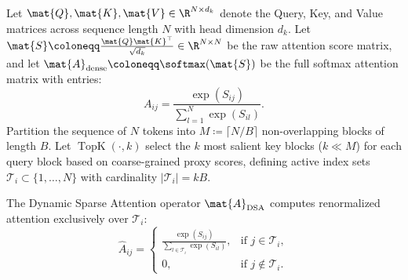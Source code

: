 \begin{theorem}
\label{thm:dsa_gradient_alignment}
Let $\mat{Q}, \mat{K}, \mat{V} \in \R^{N \times d_k}$ denote the Query, Key, and Value matrices across sequence length $N$ with head dimension $d_k$. Let $\mat{S} \coloneqq \frac{\mat{Q} \mat{K}^\top}{\sqrt{d_k}} \in \R^{N \times N}$ be the raw attention score matrix, and let $\mat{A}_{\text{dense}} \coloneqq \softmax(\mat{S})$ be the full softmax attention matrix with entries:
\begin{equation}
A_{ij} = \frac{\exp(S_{ij})}{\sum_{l=1}^N \exp(S_{il})}.
\label{eq:dense_softmax_entry}
\end{equation}
Partition the sequence of $N$ tokens into $M \coloneqq \lceil N / B \rceil$ non-overlapping blocks of length $B$. Let $\operatorname{TopK}(\cdot, k)$ select the $k$ most salient key blocks ($k \ll M$) for each query block based on coarse-grained proxy scores, defining active index sets $\mathcal{T}_i \subset \{1, \dots, N\}$ with cardinality $|\mathcal{T}_i| = k B$.

The Dynamic Sparse Attention operator $\mat{A}_{\text{DSA}}$ computes renormalized attention exclusively over $\mathcal{T}_i$:
\begin{equation}
\widehat{A}_{ij} = \begin{cases}
\frac{\exp(S_{ij})}{\sum_{l \in \mathcal{T}_i} \exp(S_{il})}, & \text{if } j \in \mathcal{T}_i, \\
0, & \text{if } j \notin \mathcal{T}_i.
\end{cases}
\label{eq:dsa_sparse_entry}
\end{equation}


\end{theorem}

